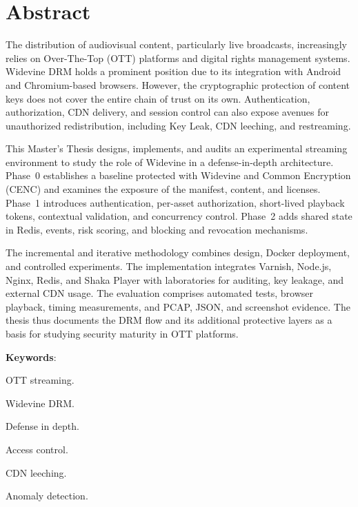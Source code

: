 
\pagestyle{fancy}
\renewcommand{\headrulewidth}{0pt}
\chapter*{Abstract}

The distribution of audiovisual content, particularly live broadcasts, increasingly relies on Over-The-Top (OTT) platforms and digital rights management systems. Widevine DRM holds a prominent position due to its integration with Android and Chromium-based browsers. However, the cryptographic protection of content keys does not cover the entire chain of trust on its own. Authentication, authorization, CDN delivery, and session control can also expose avenues for unauthorized redistribution, including Key Leak, CDN leeching, and restreaming.

This Master's Thesis designs, implements, and audits an experimental streaming environment to study the role of Widevine in a defense-in-depth architecture. Phase~0 establishes a baseline protected with Widevine and Common Encryption (CENC) and examines the exposure of the manifest, content, and licenses. Phase~1 introduces authentication, per-asset authorization, short-lived playback tokens, contextual validation, and concurrency control. Phase~2 adds shared state in Redis, events, risk scoring, and blocking and revocation mechanisms.

The incremental and iterative methodology combines design, Docker deployment, and controlled experiments. The implementation integrates Varnish, Node.js, Nginx, Redis, and Shaka Player with laboratories for auditing, key leakage, and external CDN usage. The evaluation comprises automated tests, browser playback, timing measurements, and PCAP, JSON, and screenshot evidence. The thesis thus documents the DRM flow and its additional protective layers as a basis for studying security maturity in OTT platforms.

\mbox{} \bigskip

\noindent \textbf{Keywords}:
\begin{compactitem}
    \item OTT streaming.
    \item Widevine DRM.
    \item Defense in depth.
    \item Access control.
    \item CDN leeching.
    \item Anomaly detection.
\end{compactitem}

\blankpage

